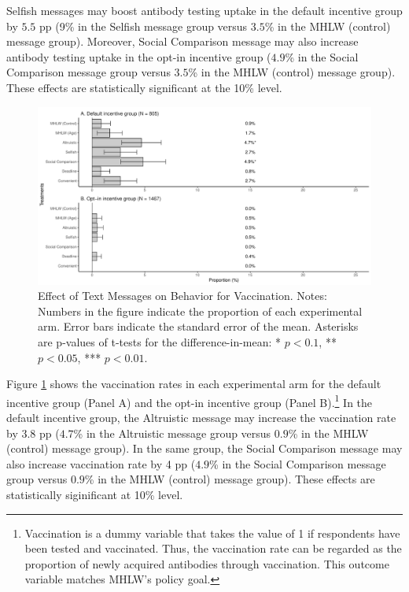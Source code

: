 \documentclass[
]{article}
\begin{document}
Selfish messages may boost antibody testing uptake in the default incentive group by \(5.5\) pp (9\% in the Selfish message group versus \(3.5\)\% in the MHLW (control) message group). Moreover, Social Comparison message may also increase antibody testing uptake in the opt-in incentive group (\(4.9\)\% in the Social Comparison message group versus \(3.5\)\% in the MHLW (control) message group). These effects are statistically significant at the 10\% level.

\begin{figure}
\centering
\includegraphics{discussion-paper_files/figure-latex/ttest-act-vacc-1.pdf}
\caption{\label{fig:ttest-act-vacc}Effect of Text Messages on Behavior for Vaccination. Notes: Numbers in the figure indicate the proportion of each experimental arm. Error bars indicate the standard error of the mean. Asterisks are p-values of t-tests for the difference-in-mean: * \(p < 0.1\), ** \(p < 0.05\), *** \(p < 0.01\).}
\end{figure}

Figure \ref{fig:ttest-act-vacc} shows the vaccination rates in each experimental arm for the default incentive group (Panel A) and the opt-in incentive group (Panel B).\footnote{Vaccination is a dummy variable that takes the value of 1 if respondents have been tested and vaccinated. Thus, the vaccination rate can be regarded as the proportion of newly acquired antibodies through vaccination. This outcome variable matches MHLW's policy goal.} In the default incentive group, the Altruistic message may increase the vaccination rate by \(3.8\) pp (\(4.7\)\% in the Altruistic message group versus \(0.9\)\% in the MHLW (control) message group). In the same group, the Social Comparison message may also increase vaccination rate by 4 pp (\(4.9\)\% in the Social Comparison message group versus \(0.9\)\% in the MHLW (control) message group). These effects are statistically siginificant at 10\% level.
\end{document}
